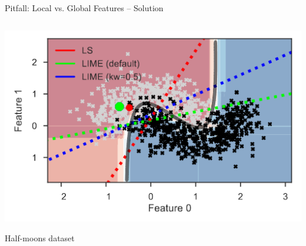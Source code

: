 \documentclass[11pt,compress,t,notes=noshow, aspectratio=169, xcolor=table]{beamer}
\begin{document}
\begin{frame}{Pitfall: Local vs. Global Features -- Solution }
\begin{columns}[T, totalwidth=\textwidth]
\begin{column}{0.39\textwidth}
	\begin{center}
	\includegraphics[width=1\textwidth]{figure/lime-globallocal2}
	
	{Half-moons dataset}
	
\end{center}

	\end{column}

\end{columns}
\end{frame}
\end{document}
